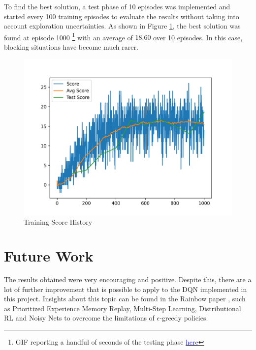 \documentclass[letterpaper]{article}
\begin{document}
To find the best solution, a test phase of 10 episodes was implemented and started every 100 training episodes to evaluate the results without taking into account exploration uncertainties. As shown in Figure \ref{fig:plot}, the best solution was found at episode 1000 \footnote{GIF reporting a handful of seconds of the testing phase \href{https://github.com/pieromacaluso/navigation/blob/daca21c0d0cdcf5bdf7028f7cde85488ea319e50/stuff/test.gif}{\textcolor{blue}{here}}} with an average of $18.60$ over 10 episodes. In this case, blocking situations have become much rarer.

\begin{figure}[]
\includegraphics[width=\linewidth]{img/plot_1000.png}
\caption{Training Score History\label{fig:plot}}
\end{figure}   

\section{Future Work}

The results obtained were very encouraging and positive. Despite this, there are a lot of further improvement that is possible to apply to the DQN implemented in this project. Insights about this topic can be found in the Rainbow paper \cite{hessel2018rainbow}, such as Prioritized Experience Memory Replay, Multi-Step Learning, Distributional RL and Noisy Nets to overcome the limitations of $\epsilon$-greedy policies.




\end{document}
